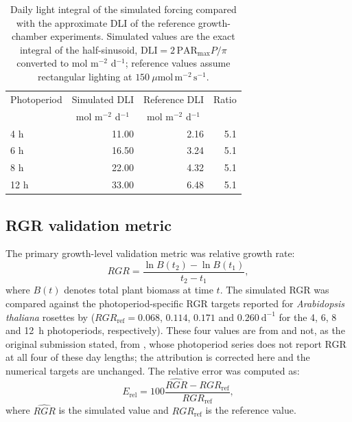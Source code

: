 \documentclass[a4paper,fleqn]{cas-sc}
\begin{document}
\begin{table}[!htbp]
\centering
\small
\caption{Daily light integral of the simulated forcing compared with the
approximate DLI of the reference growth-chamber experiments. Simulated
values are the exact integral of the half-sinusoid,
$\mathrm{DLI}=2\,\mathrm{PAR}_{\max}P/\pi$ converted to
mol m$^{-2}$ d$^{-1}$; reference values assume rectangular lighting at
$150\ \mu\mathrm{mol\,m^{-2}\,s^{-1}}$.}
\label{tab:dli}
\begin{tabular}{@{}lrrr@{}}
\toprule
Photoperiod & Simulated DLI & Reference DLI & Ratio \\
            & \multicolumn{1}{c}{\footnotesize mol m$^{-2}$ d$^{-1}$}
            & \multicolumn{1}{c}{\footnotesize mol m$^{-2}$ d$^{-1}$} & \\
\midrule
4 h  & 11.00 & 2.16 & 5.1 \\
6 h  & 16.50 & 3.24 & 5.1 \\
8 h  & 22.00 & 4.32 & 5.1 \\
12 h & 33.00 & 6.48 & 5.1 \\
\bottomrule
\end{tabular}
\end{table}

\subsection{RGR validation metric}

The primary growth-level validation metric was relative growth rate:
\begin{equation}
RGR =
\frac{\ln B(t_2) - \ln B(t_1)}
{t_2 - t_1},
\end{equation}
where $B(t)$ denotes total plant biomass at time $t$. The simulated RGR was
compared against the photoperiod-specific RGR targets reported for
\textit{Arabidopsis thaliana} rosettes by \citet{Sulpice2014}
($RGR_{\mathrm{ref}} = 0.068$, $0.114$, $0.171$ and $0.260~\mathrm{d}^{-1}$
for the 4, 6, 8 and 12~h photoperiods, respectively). These four values are
from \citet{Sulpice2014} and not, as the original submission stated, from
\citet{Annunziata2017}, whose photoperiod series does not report RGR at all
four of these day lengths; the attribution is corrected here and the numerical
targets are unchanged. The
relative error was computed as:
\begin{equation}
E_{\mathrm{rel}} =
100
\frac{\hat{RGR} - RGR_{\mathrm{ref}}}
{RGR_{\mathrm{ref}}},
\end{equation}
where $\hat{RGR}$ is the simulated value and $RGR_{\mathrm{ref}}$ is the
reference value.
\end{document}
